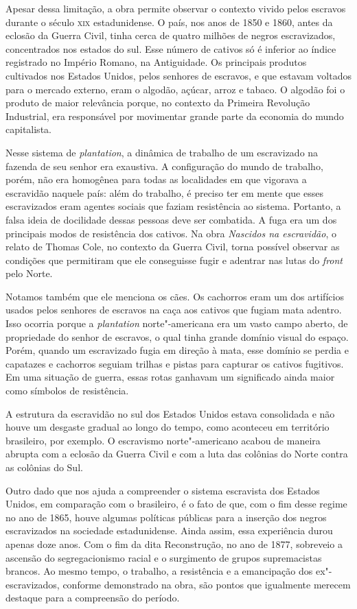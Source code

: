 Apesar dessa limitação,
a obra permite observar o contexto vivido pelos escravos durante o
século \textsc{xix} estadunidense. O país, nos anos de 1850 e 1860, antes da
eclosão da Guerra Civil, tinha cerca de quatro milhões de negros
escravizados, concentrados nos estados do sul. Esse número de cativos só
é inferior ao índice registrado no Império Romano, na Antiguidade. Os
principais produtos cultivados nos Estados Unidos, pelos senhores de
escravos, e que estavam voltados para o mercado externo, eram o algodão,
açúcar, arroz e tabaco. O algodão foi o produto de maior
relevância porque, no contexto da Primeira Revolução Industrial, era
responsável por movimentar grande parte da economia do mundo
capitalista.

Nesse sistema de \emph{plantation}, a dinâmica de trabalho de um
escravizado na fazenda de seu senhor era exaustiva. A configuração do
mundo de trabalho, porém, não era homogênea para todas as localidades em
que vigorava a escravidão naquele país: além do trabalho, é preciso ter
em mente que esses escravizados eram agentes sociais que faziam
resistência ao sistema. Portanto, a falsa ideia de docilidade dessas
pessoas deve ser combatida. A fuga era um dos principais modos de
resistência dos cativos. Na obra \emph{Nascidos na escravidão}, o relato
de Thomas Cole, no contexto da Guerra Civil, torna possível observar as
condições que permitiram que ele conseguisse fugir e adentrar nas lutas
do \emph{front} pelo Norte.

Notamos também que ele menciona os cães. Os cachorros eram um dos
artifícios usados pelos senhores de escravos na caça aos cativos que
fugiam mata adentro. Isso ocorria porque a \emph{plantation}
norte"-americana era um vasto campo aberto, de propriedade do senhor de
escravos, o qual tinha grande domínio visual do espaço. Porém, quando um
escravizado fugia em direção à mata, esse domínio se perdia e capatazes
e cachorros seguiam trilhas e pistas para capturar os cativos fugitivos.
Em uma situação de guerra, essas rotas ganhavam um significado ainda
maior como símbolos de resistência.

A estrutura da escravidão no sul dos Estados Unidos estava consolidada e
não houve um desgaste gradual ao longo do tempo, como aconteceu em
território brasileiro, por exemplo. O escravismo norte"-americano acabou
de maneira abrupta com a eclosão da Guerra Civil e com a luta das
colônias do Norte contra as colônias do Sul.

Outro dado que nos ajuda a compreender o sistema escravista dos Estados
Unidos, em comparação com o brasileiro, é o fato de que, com o fim desse
regime no ano de 1865, houve algumas políticas públicas para a inserção
dos negros escravizados na sociedade estadunidense. Ainda assim, essa
experiência durou apenas doze anos. Com o fim da dita Reconstrução, no
ano de 1877, sobreveio a ascensão do segregacionismo racial e o
surgimento de grupos supremacistas brancos. Ao mesmo tempo, o trabalho,
a resistência e a emancipação dos ex"-escravizados, conforme demonstrado
na obra, são pontos que igualmente merecem destaque para a compreensão
do período.

